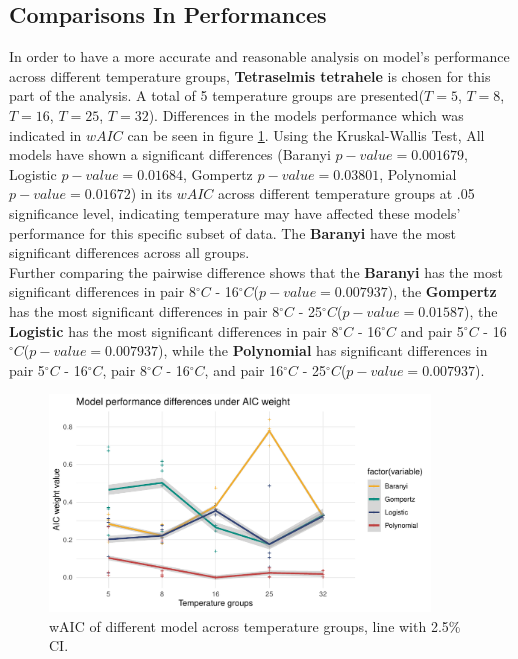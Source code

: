 \documentclass[11pt]{article}
\begin{document}
\subsection{Comparisons In Performances}\label{comparison}
In order to have a more accurate and reasonable analysis on model's performance across different temperature groups, \textbf{Tetraselmis tetrahele} is chosen for this part of the analysis. A total of 5 temperature groups are presented($T=5$, $T=8$, $T=16$, $T=25$, $T=32$). Differences in the models performance which was indicated in $wAIC$ can be seen in figure \ref{fig:tempwaic}. Using the Kruskal-Wallis Test, All models have shown a significant differences (Baranyi $p-value = 0.001679$, Logistic $p-value = 0.01684$, Gompertz $p-value = 0.03801$, Polynomial $p-value = 0.01672$) in its $wAIC$ across different temperature groups at .05 significance level, indicating temperature may have affected these models' performance for this specific subset of data. The \textbf{Baranyi} have the most significant differences across all groups. \\ 
Further comparing the pairwise difference shows that the \textbf{Baranyi} has the most significant differences in pair 8$^\circ C$ - 16$^\circ C$($p-value = 0.007937$), the \textbf{Gompertz} has the most significant differences in pair 8$^\circ C$ - 25$^\circ C$($p-value = 0.01587$), the \textbf{Logistic} has the most significant differences in pair 8$^\circ C$ - 16$^\circ C$ and pair 5$^\circ C$ - 16$^\circ C$($p-value = 0.007937$), while the \textbf{Polynomial} has significant differences in pair 5$^\circ C$ - 16$^\circ C$, pair 8$^\circ C$ - 16$^\circ C$, and pair 16$^\circ C$ - 25$^\circ C$($p-value = 0.007937$).\\
\FloatBarrier 
\begin{figure}[!htbp]
    \centering
    \includegraphics[width=0.9\textwidth]{../Results/anaPlots/wAICtemp.pdf}
    \caption{wAIC of different model across temperature groups, line with 2.5\% CI. }
    \label{fig:tempwaic}
\end{figure}
\end{document}
